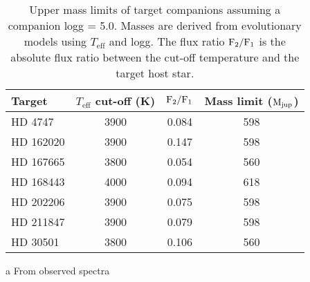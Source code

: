 \begin{table}
       \centering
  \begin{threeparttable}
     
       \caption{Upper mass limits of target companions assuming a companion logg = 5.0. Masses are derived from \citet{baraffe_new_2015} evolutionary models using \(T_{\textrm{eff}}\) and logg. The flux ratio \(\rm F_2/F_1\) is  the absolute flux ratio between the cut-off temperature and the target host star.}
      
        \begin{tabular}{l c c c}
            \toprule
            Target & \(T_{\textrm{eff}}\) cut-off (K) & \(\rm F_2/F_1\) & Mass limit ($\rm M_{jup}$)\\
            \midrule
            {HD 4747}     &  3900 & 0.084 & 598 \\ 
            {HD 162020} & 3900 & 0.147 & 598 \\
            {HD 167665} & 3800 & 0.054 & 560 \\
            {HD 168443} & 4000 & 0.094 & 618 \\
            {HD 202206} & 3900 & 0.075 & 598 \\
            {HD 211847} & 3900 & 0.079 & 598 \\
            {HD 30501}   & 3800\tnote{a} & 0.106 & 560 \\
            \bottomrule
        \end{tabular}
        \label{tab:mass_limits}
        \begin{tablenotes}[flushleft]
            \small
                \item [a] {From observed spectra }
        \end{tablenotes}
  \end{threeparttable}

\end{table}

